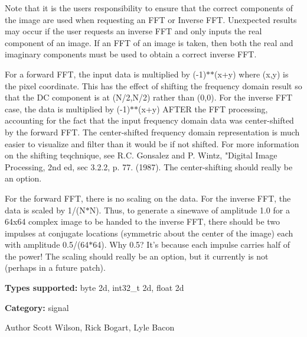 Note that it is the users responsibility to ensure that the correct components of the image are used when requesting an FFT or Inverse FFT. Unexpected results may occur if the user requests an inverse FFT and only inputs the real component of an image. If an FFT of an image is taken, then both the real and imaginary components must be used to obtain a correct inverse FFT.

For a forward FFT, the input data is multiplied by (-\/1)$\ast$$\ast$(x+y) where (x,y) is the pixel coordinate. This has the effect of shifting the frequency domain result so that the DC component is at (N/2,N/2) rather than (0,0). For the inverse FFT case, the data is multiplied by (-\/1)$\ast$$\ast$(x+y) AFTER the FFT processing, accounting for the fact that the input frequency domain data was center-\/shifted by the forward FFT. The center-\/shifted frequency domain representation is much easier to visualize and filter than it would be if not shifted. For more information on the shifting teqchnique, see R.C. Gonsalez and P. Wintz, "Digital Image Processing, 2nd ed, sec 3.2.2, p. 77. (1987). The center-\/shifting should really be an option.

For the forward FFT, there is no scaling on the data. For the inverse FFT, the data is scaled by 1/(N$\ast$N). Thus, to generate a sinewave of amplitude 1.0 for a 64x64 complex image to be handed to the inverse FFT, there should be two impulses at conjugate locations (symmetric about the center of the image) each with amplitude 0.5/(64$\ast$64). Why 0.5? It's because each impulse carries half of the power! The scaling should really be an option, but it currently is not (perhaps in a future patch).

{\bfseries Types supported:} byte 2d, int32\_\-t 2d, float 2d

{\bfseries Category:} signal

\begin{DoxyAuthor}{Author}
Scott Wilson, Rick Bogart, Lyle Bacon 
\end{DoxyAuthor}
